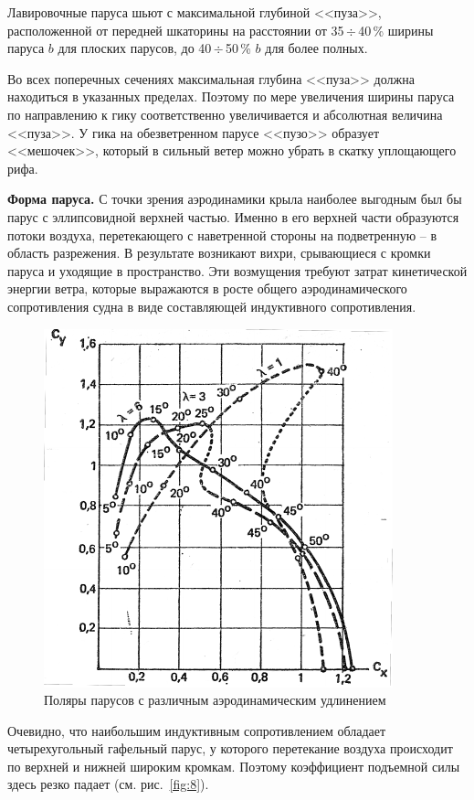 \documentclass[a4paper, 12pt, twoside, final, book, russian, fittopage, cyremdash]{ncc}
\newcommand{\otdo}{\,\ensuremath{\div}\,}
\newcommand{\ris}[1]{\ref{fig:#1}}
\begin{document}
Лавировочные паруса шьют с максимальной глубиной <<пуза>>, расположенной от передней шкаторины на расстоянии от 35\otdo 40\,\% ширины паруса $b$ для плоских парусов, до 40\otdo 50\,\% $b$ для более полных.

Во всех поперечных сечениях максимальная глубина <<пуза>> должна находиться в указанных пределах. Поэтому по мере увеличения ширины паруса по направлению к гику соответственно увеличивается и абсолютная величина <<пуза>>. У гика на обезветренном парусе <<пузо>> образует <<мешочек>>, который в сильный ветер можно убрать в скатку уплощающего рифа.

\textbf{Форма паруса.} С точки зрения аэродинамики крыла наиболее выгодным был бы парус с эллипсовидной верхней частью. Именно в его верхней части образуются потоки воздуха, перетекающего с наветренной стороны на подветренную \--- в область разрежения. В результате возникают вихри, срывающиеся с кромки паруса и уходящие в пространство. Эти возмущения требуют затрат кинетической энергии ветра, которые выражаются в росте общего аэродинамического сопротивления судна в виде составляющей индуктивного сопротивления. 

\begin{figure}[htb]
  \centering
  \includegraphics[scale=1.2]{0028P}
  \caption{Поляры парусов с различным аэродинамическим удлинением}
  \label{fig:28}
\end{figure}

Очевидно, что наибольшим индуктивным сопротивлением обладает четырехугольный гафельный парус, у которого перетекание воздуха происходит по верхней и нижней широким кромкам. Поэтому коэффициент подъемной силы здесь резко падает (см. рис.~\ris{8}).
\end{document}
